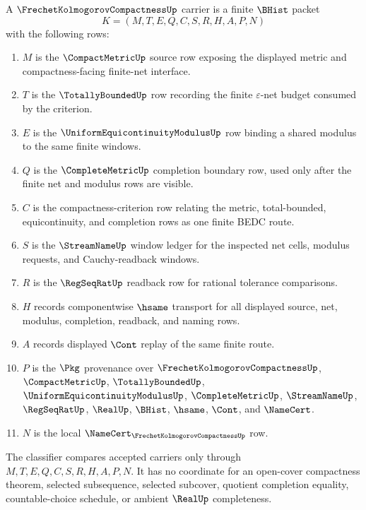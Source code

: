 \begin{definition}
\label{def:frechet-kolmogorov-compactness-carrier}
A $\FrechetKolmogorovCompactnessUp$ carrier is a finite $\BHist$ packet
$$
K=(M,T,E,Q,C,S,R,H,A,P,N)
$$
with the following rows:
\begin{enumerate}
\item $M$ is the $\CompactMetricUp$ source row exposing the displayed metric and compactness-facing finite-net interface.
\item $T$ is the $\TotallyBoundedUp$ row recording the finite $\varepsilon$-net budget consumed by the criterion.
\item $E$ is the $\UniformEquicontinuityModulusUp$ row binding a shared modulus to the same finite windows.
\item $Q$ is the $\CompleteMetricUp$ completion boundary row, used only after the finite net and modulus rows are visible.
\item $C$ is the compactness-criterion row relating the metric, total-bounded, equicontinuity, and completion rows as one finite BEDC route.
\item $S$ is the $\StreamNameUp$ window ledger for the inspected net cells, modulus requests, and Cauchy-readback windows.
\item $R$ is the $\RegSeqRatUp$ readback row for rational tolerance comparisons.
\item $H$ records componentwise $\hsame$ transport for all displayed source, net, modulus, completion, readback, and naming rows.
\item $A$ records displayed $\Cont$ replay of the same finite route.
\item $P$ is the $\Pkg$ provenance over $\FrechetKolmogorovCompactnessUp$, $\CompactMetricUp$, $\TotallyBoundedUp$, $\UniformEquicontinuityModulusUp$, $\CompleteMetricUp$, $\StreamNameUp$, $\RegSeqRatUp$, $\RealUp$, $\BHist$, $\hsame$, $\Cont$, and $\NameCert$.
\item $N$ is the local $\NameCert_{\FrechetKolmogorovCompactnessUp}$ row.
\end{enumerate}
The classifier compares accepted carriers only through $M,T,E,Q,C,S,R,H,A,P,N$. It has no coordinate for an open-cover compactness theorem, selected subsequence, selected subcover, quotient completion equality, countable-choice schedule, or ambient $\RealUp$ completeness.
\end{definition}

